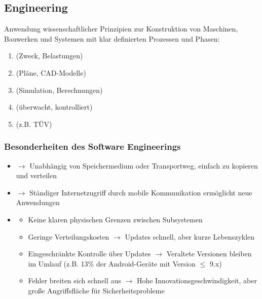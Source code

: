 \subsection{Engineering}
\begin{definition}[Engineering]
    Anwendung wissenschaftlicher Prinzipien zur Konstruktion von Maschinen, Bauwerken und Systemen mit klar definierten Prozessen und Phasen:
    \begin{enumerate}
        \item {} (Zweck, Belastungen)
        \item {} (Pläne, CAD-Modelle)
        \item {} (Simulation, Berechnungen)
        \item {} (überwacht, kontrolliert)
        \item {} (z.B. TÜV)
    \end{enumerate}
\end{definition}
\subsubsection{Besonderheiten des Software Engineerings}
\begin{itemize}
    \item {} $\rightarrow$ Unabhängig von Speichermedium oder Transportweg, einfach zu kopieren und verteilen
    \item {} $\rightarrow$ Ständiger Internetzugriff durch mobile Kommunikation ermöglicht neue Anwendungen
    \item {}
    \begin{itemize}
        \item Keine klaren physischen Grenzen zwischen Subsystemen
        \item Geringe Verteilungskosten $\rightarrow$ Updates schnell, aber kurze Lebenszyklen
        \item Eingeschränkte Kontrolle über Updates $\rightarrow$ Veraltete Versionen bleiben im Umlauf (z.B. 13\% der Android-Geräte mit Version $\leq$ 9.x)
        \item Fehler breiten sich schnell aus $\rightarrow$ Hohe Innovationsgeschwindigkeit, aber große Angriffsfläche für Sicherheitsprobleme
    \end{itemize}
\end{itemize}
